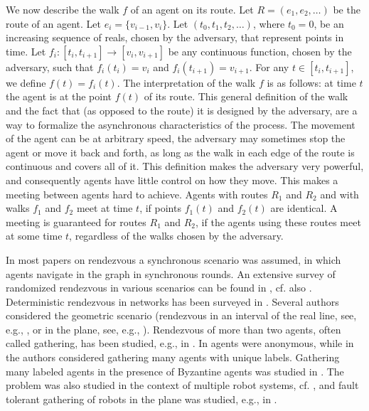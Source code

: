 \documentclass [11pt] {article}
\begin{document}
We now describe the walk $f$ of an agent on its route. Let $R=(e_1,e_2,\dots)$ be the route of an agent. Let $e_i=\{v_{i-1},v_i\}$.
Let $(t_0,t_1,t_2,\dots)$, where $t_0=0$, be an increasing sequence of reals, chosen by the adversary, 
that represent points in time. Let $f_i:[t_i,t_{i+1}]\rightarrow [v_i,v_{i+1}]$ be any continuous function, chosen by the adversary, such that $f_i(t_i)=v_i$ and $f_i(t_{i+1})=v_{i+1}$. For any $t\in [t_i,t_{i+1}]$, we define $f(t)=f_i(t)$. 
The interpretation of the walk $f$ is as follows: at time $t$ the agent
is at the point $f(t)$ of its route.  This general definition of the walk and the fact that (as opposed to the route) it is designed by the adversary,
are a way to formalize the asynchronous characteristics of the process.  The movement of the agent can be
at arbitrary speed, the adversary may sometimes stop the agent or move it back and forth, as long as the walk 
in each edge of the route is continuous and covers all of it.
This definition makes the adversary very powerful,
and consequently agents have little control on how they move. This makes a meeting between agents hard to achieve.
Agents with routes $R_1$ and $R_2$ and with walks $f_1$ and $f_2$ meet at time $t$,
if points $f_1(t )$ and $f_2(t )$ are identical. 
A meeting is guaranteed for routes $R_1$ and $R_2$,
if the agents using these routes meet at some time $t$, regardless of the walks chosen by the adversary.







In most papers on rendezvous a synchronous scenario was assumed, in which agents navigate in the graph in synchronous rounds.
An extensive survey of  randomized rendezvous in various scenarios can be found in
\cite{alpern02b}, cf. also  \cite{alpern95a,alpern02a,alpern99,anderson90}. 
Deterministic rendezvous in networks has been surveyed in \cite{Pe}.
Several authors
considered the geometric scenario (rendezvous in an interval of the real line, see, e.g.,  \cite{baston01},
or in the plane, see, e.g., \cite{anderson98a,anderson98b}).
Rendezvous of  more than two agents, often called gathering, has been studied, e.g., 
in \cite{DiPe,DPP,lim96,YY}. In \cite{DiPe} agents were anonymous, while in~\cite{YY} the authors considered 
gathering many agents with unique labels. Gathering many labeled agents in the presence of Byzantine agents was studied in \cite{DPP}. 
The problem was also studied in the context of multiple robot systems, cf.
\cite{CP05,fpsw}, and fault tolerant gathering of robots in the plane was studied, e.g., in \cite{AP06,CP08}. 
\end{document}
